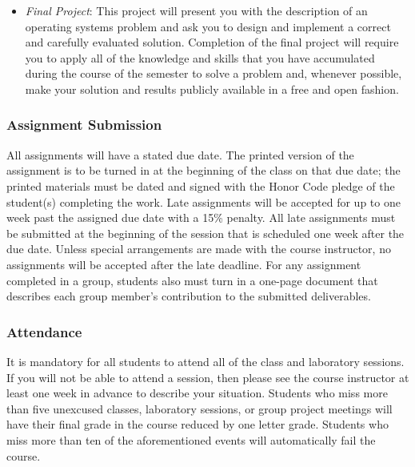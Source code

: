 \begin{itemize}
    \item {\em Final Project}: This project will present you with the description of an operating systems problem
      and ask you to design and implement a correct and carefully evaluated solution. Completion of the final
      project will require you to apply all of the knowledge and skills that you have accumulated during the course
      of the semester to solve a problem and, whenever possible, make your solution and results publicly available
      in a free and open fashion.

\end{itemize}

\subsubsection*{Assignment Submission}

All assignments will have a stated due date. The printed version of the assignment is to be turned in at the beginning
of the class on that due date; the printed materials must be dated and signed with the Honor Code pledge of the
student(s) completing the work.  Late assignments will be accepted for up to one week past the assigned due date with a
15\% penalty. All late assignments must be submitted at the beginning of the session that is scheduled one week after
the due date. Unless special arrangements are made with the course instructor, no assignments will be accepted after the
late deadline. For any assignment completed in a group, students also must turn in a one-page document that describes
each group member's contribution to the submitted deliverables.

\subsubsection*{Attendance}

It is mandatory for all students to attend all of the class and laboratory sessions. If you will not be able to attend a
session, then please see the course instructor at least one week in advance to describe your situation.  Students who
miss more than five unexcused classes, laboratory sessions, or group project meetings will have their final grade in the
course reduced by one letter grade. Students who miss more than ten of the aforementioned events will automatically fail
the course.

